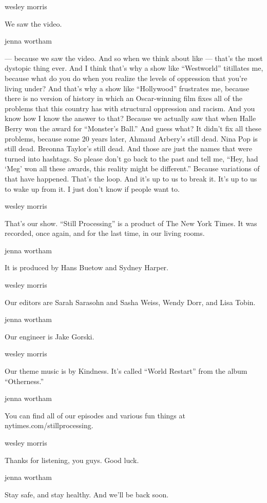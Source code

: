 wesley morris

We saw the video.

jenna wortham

--- because we saw the video. And so when we think about like --- that's
the most dystopic thing ever. And I think that's why a show like
``Westworld'' titillates me, because what do you do when you realize the
levels of oppression that you're living under? And that's why a show
like ``Hollywood'' frustrates me, because there is no version of history
in which an Oscar-winning film fixes all of the problems that this
country has with structural oppression and racism. And you know how I
know the answer to that? Because we actually saw that when Halle Berry
won the award for ``Monster's Ball.'' And guess what? It didn't fix all
these problems, because some 20 years later, Ahmaud Arbery's still dead.
Nina Pop is still dead. Breonna Taylor's still dead. And those are just
the names that were turned into hashtags. So please don't go back to the
past and tell me, ``Hey, had `Meg' won all these awards, this reality
might be different.'' Because variations of that have happened. That's
the loop. And it's up to us to break it. It's up to us to wake up from
it. I just don't know if people want to.

wesley morris

That's our show. ``Still Processing'' is a product of The New York
Times. It was recorded, once again, and for the last time, in our living
rooms.

jenna wortham

It is produced by Hans Buetow and Sydney Harper.

wesley morris

Our editors are Sarah Sarasohn and Sasha Weiss, Wendy Dorr, and Lisa
Tobin.

jenna wortham

Our engineer is Jake Gorski.

wesley morris

Our theme music is by Kindness. It's called ``World Restart'' from the
album ``Otherness.''

jenna wortham

You can find all of our episodes and various fun things at
nytimes.com/stillprocessing.

wesley morris

Thanks for listening, you guys. Good luck.

jenna wortham

Stay safe, and stay healthy. And we'll be back soon.


